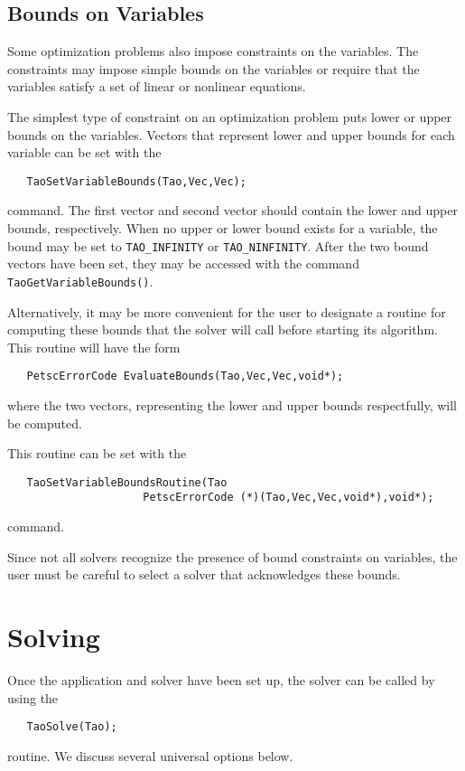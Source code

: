 \subsection{Bounds on Variables}\label{sec:bounds}

Some optimization problems also impose constraints on the variables.
The constraints may impose simple bounds on the variables or
require that the variables satisfy a set of linear or  nonlinear equations.

The simplest type of constraint on an optimization problem puts lower
or upper bounds on the variables. 
Vectors that represent lower and upper bounds for each variable 
can be set with the   
\begin{verbatim}
   TaoSetVariableBounds(Tao,Vec,Vec);
\end{verbatim}
command. 
The first vector and second vector should contain the lower and upper 
bounds, respectively.
When no upper or lower bound exists for a variable, the bound
may be set to {\tt TAO\_INFINITY} or {\tt TAO\_NINFINITY}.
After the two bound vectors have been set, they may be accessed
with the command  {\tt TaoGetVariableBounds()}.

Alternatively, it may be more convenient for the user to designate a routine 
for computing these bounds
that the solver will call before starting its algorithm.  This routine will
have the form
\begin{verbatim}
   PetscErrorCode EvaluateBounds(Tao,Vec,Vec,void*);
\end{verbatim}
where the two vectors, representing the lower and upper bounds respectfully, 
will be computed.

This routine can be set with the 
\begin{verbatim}
   TaoSetVariableBoundsRoutine(Tao
                     PetscErrorCode (*)(Tao,Vec,Vec,void*),void*);
\end{verbatim}
command.
   
Since not all solvers recognize the presence of bound constraints on 
variables, the user must be careful 
to select a solver that acknowledges these bounds.


\section{Solving}
Once the application and solver have been set up, the solver can be 
 called by using the 
\begin{verbatim}
   TaoSolve(Tao);
\end{verbatim}
routine.
We discuss several universal options below. 

